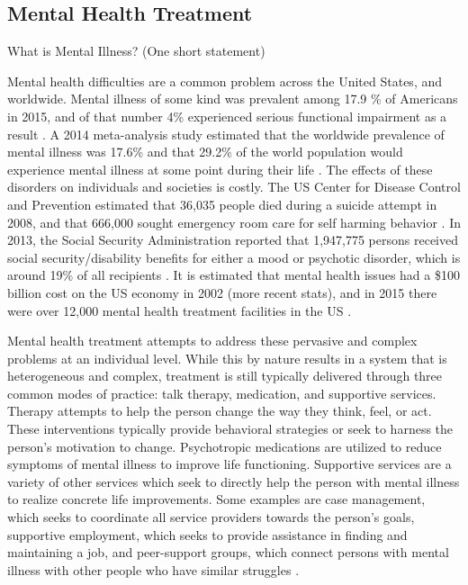 \documentclass[sigconf]{acmart}
\begin{document}
\subsection{Mental Health Treatment}
What is Mental Illness? (One short statement)

Mental health difficulties are a common problem across the United States, and worldwide. Mental illness of some kind was prevalent among 17.9 \% of Americans in 2015, and of that number 4\% experienced serious functional impairment as a result \cite{nihmstats}. A 2014 meta-analysis study estimated that the worldwide prevalence of mental illness was 17.6\% and that 29.2\% of the world population would experience mental illness at some point during their life \cite{worldprev}. The effects of these disorders on individuals and societies is costly. The US Center for Disease Control and Prevention estimated that 36,035 people died during a suicide attempt in 2008, and that 666,000 sought emergency room care for self harming behavior \cite{cdcsuicide}. In 2013, the Social Security Administration reported that 1,947,775 persons received social security/disability benefits for either a mood or psychotic disorder, which is around 19\% of all recipients \cite{ssarecipients}. It is estimated that mental health issues had a \$100 billion cost on the US economy in 2002 \cite{nihmstats} (more recent stats), and in 2015 there were over 12,000 mental health treatment facilities in the US \cite{n-mhss2015}.

Mental health treatment attempts to address these pervasive and complex problems at an individual level. While this by nature results in a system that is heterogeneous and complex, treatment is still typically delivered through three common modes of practice: talk therapy, medication, and supportive services. Therapy attempts to help the person change the way they think, feel, or act. These interventions typically provide behavioral strategies or seek to harness the person's motivation to change. Psychotropic medications are utilized to reduce symptoms of mental illness to improve life functioning. Supportive services are a variety of other services which seek to directly help the person with mental illness to realize concrete life improvements. Some examples are case management, which seeks to coordinate all service providers towards the person's goals, supportive employment, which seeks to provide assistance in finding and maintaining a job, and peer-support groups, which connect persons with mental illness with other people who have similar struggles \cite{samhsatx}.
\end{document}
